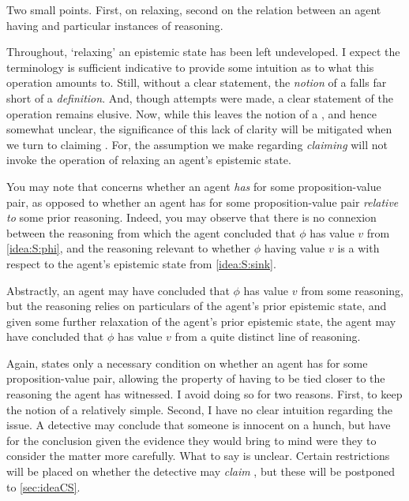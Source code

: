 \begin{note}
  Two small points.
  First, on relaxing, second on the relation between an agent having \support{} and particular instances of reasoning.
\end{note}

\begin{note}[`Relaxing']
  Throughout, `relaxing' an epistemic state has been left undeveloped.
  I expect the terminology is sufficient indicative to provide some intuition as to what this operation amounts to.
  Still, without a clear statement, the \emph{notion} of a \sink{} falls far short of a \emph{definition}.
  And, though attempts were made, a clear statement of the operation remains elusive.
  Now, while this leaves the notion of a \sink{}, and hence \ideaS{} somewhat unclear, the significance of this lack of clarity will be mitigated when we turn to claiming \support{}.
  For, the assumption we make regarding \emph{claiming} \support{} will not invoke the operation of relaxing an agent's epistemic state.
\end{note}

\begin{note}
  You may note that \ideaS{} concerns whether an agent \emph{has} \support{} for some proposition-value pair, as opposed to whether an agent has \support{} for some proposition-value pair \emph{relative to} some prior reasoning.
  Indeed, you may observe that there is no connexion between the reasoning from which the agent concluded that \(\phi\) has value \(v\) from \ref{idea:S:phi}, and the reasoning relevant to whether \(\phi\) having value \(v\) is a \sink{} with respect to the agent's epistemic state from \ref{idea:S:sink}.

  Abstractly, an agent may have concluded that \(\phi\) has value \(v\) from some reasoning, but the reasoning relies on particulars of the agent's prior epistemic state, and given some further relaxation of the agent's prior epistemic state, the agent may have concluded that \(\phi\) has value \(v\) from a quite distinct line of reasoning.

  Again, \ideaS{} states only a necessary condition on whether an agent has \support{} for some proposition-value pair, allowing the property of having \support{} to be tied closer to the reasoning the agent has witnessed.
  I avoid doing so for two reasons.
  First, to keep the notion of a \sink{} relatively simple.
  Second, I have no clear intuition regarding the issue.
  A detective may conclude that someone is innocent on a hunch, but have \support{} for the conclusion given the evidence they would bring to mind were they to consider the matter more carefully.
  What to say is unclear.
  Certain restrictions will be placed on whether the detective may \emph{claim} \support{}, but these will be postponed to \autoref{sec:ideaCS}.
\end{note}

